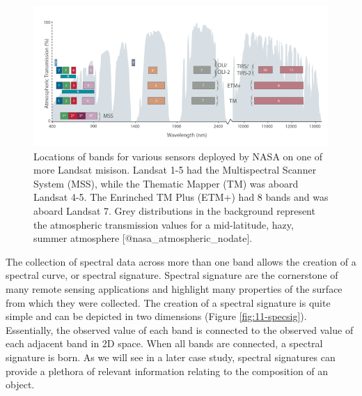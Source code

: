\documentclass[
]{book}
\begin{document}
\begin{figure}
\includegraphics[width=1\linewidth]{images/11-landsat-bands} \caption{Locations of bands for various sensors deployed by NASA on one of more Landsat misison. Landsat 1-5 had the Multispectral Scanner System (MSS), while the Thematic Mapper (TM) was aboard Landsat 4-5. The Enrinched TM Plus (ETM+) had 8 bands and was aboard Landsat 7. Grey distributions in the background represent the atmospheric transmission values for a mid-latitude, hazy, summer atmosphere [@nasa_atmospheric_nodate].}\label{fig:11-landsat-bands}
\end{figure}

The collection of spectral data across more than one band allows the creation of a spectral curve, or spectral signature. Spectral signature are the cornerstone of many remote sensing applications and highlight many properties of the surface from which they were collected. The creation of a spectral signature is quite simple and can be depicted in two dimensions (Figure \ref{fig:11-specsig}). Essentially, the observed value of each band is connected to the observed value of each adjacent band in 2D space. When all bands are connected, a spectral signature is born. As we will see in a later case study, spectral signatures can provide a plethora of relevant information relating to the composition of an object.
\end{document}
